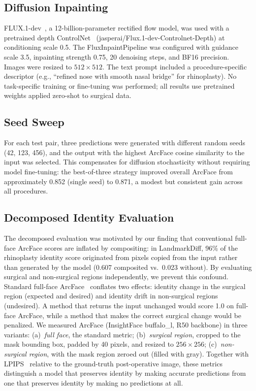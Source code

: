 \documentclass[twocolumn]{article}
\begin{document}
\subsection{Diffusion Inpainting}

FLUX.1-dev~\cite{flux2024}, a 12-billion-parameter rectified flow
model, was used with a pretrained depth
ControlNet~\cite{zhang2023controlnet} (jasperai/Flux.1-dev-Controlnet-Depth)
at conditioning scale 0.5. The FluxInpaintPipeline was configured with
guidance scale 3.5, inpainting strength 0.75, 20 denoising steps, and
BF16 precision. Images were resized to $512 \times 512$. The text prompt
included a procedure-specific descriptor (e.g., ``refined nose with
smooth nasal bridge'' for rhinoplasty). No task-specific training or
fine-tuning was performed; all results use pretrained weights applied
zero-shot to surgical data.

\subsection{Seed Sweep}

For each test pair, three predictions were generated with different
random seeds (42, 123, 456), and the output with the highest ArcFace
cosine similarity to the input was selected. This compensates for
diffusion stochasticity without requiring model fine-tuning: the
best-of-three strategy improved overall ArcFace from approximately
0.852 (single seed) to 0.871, a modest but consistent gain across
all procedures.

\subsection{Decomposed Identity Evaluation}

The decomposed evaluation was motivated by our finding that conventional
full-face ArcFace scores are inflated by compositing: in LandmarkDiff,
96\% of the rhinoplasty identity score originated from pixels copied from the input
rather than generated by the model (0.607 composited vs.\ 0.023 without).
By evaluating surgical and non-surgical regions independently, we prevent
this confound. Standard full-face ArcFace~\cite{deng2019arcface} conflates
two effects: identity change in the surgical region (expected and desired)
and identity drift in non-surgical regions (undesired). A method that
returns the input unchanged would score 1.0 on full-face ArcFace, while a
method that makes the correct surgical change would be penalized. We
measured ArcFace (InsightFace buffalo\_l, R50 backbone) in three variants:
(a)~\emph{full face}, the standard metric;
(b)~\emph{surgical region}, cropped to the mask bounding box, padded by
40 pixels, and resized to $256 \times 256$;
(c)~\emph{non-surgical region}, with the mask region zeroed out (filled
with gray). Together with LPIPS~\cite{zhang2018lpips} relative to the
ground-truth post-operative image, these metrics distinguish a model that
preserves identity by making accurate predictions from one that preserves
identity by making no predictions at all.
\end{document}
